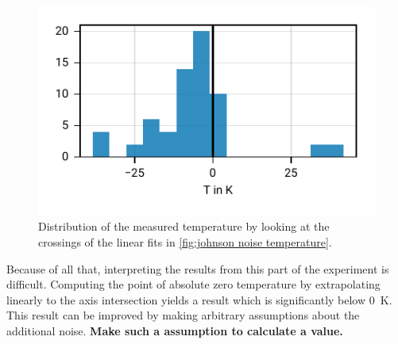 \documentclass[
    parskip=half, 
    twoside=false,
    twocolumn=true,
    fontsize=11pt,
]{scrarticle}
\begin{document}
\begin{figure}[h!]
    \centering
    \includegraphics{figures/02 temperature distribution.pdf}
    \caption{
        Distribution of the measured temperature by looking at the crossings of the linear fits in \autoref{fig:johnson noise temperature}.
    }
    \label{fig:johnson noise temperature distribution}
\end{figure}
Because of all that, interpreting the results from this part of the experiment is difficult. 
Computing the point of absolute zero temperature by extrapolating linearly to the axis intersection yields a result which is significantly below \SI{0}{\kelvin}. 
This result can be improved by making arbitrary assumptions about the additional noise. 
\textbf{Make such a assumption to calculate a value.}
\end{document}
